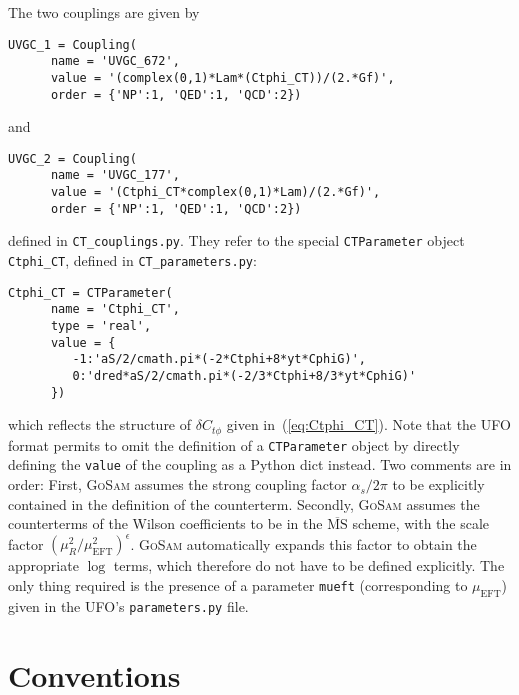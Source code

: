 \documentclass[11pt,a4paper]{refrep}
\newcommand{\gosam}{\textsc{GoSam}\xspace}
\newcommand{\python}{{Python}\xspace}
\begin{document}
The two couplings are given by
\begin{lstlisting}[gobble=3,style=py]
   UVGC_1 = Coupling(
      name = 'UVGC_672',
      value = '(complex(0,1)*Lam*(Ctphi_CT))/(2.*Gf)',
      order = {'NP':1, 'QED':1, 'QCD':2})
\end{lstlisting}
and
\begin{lstlisting}[gobble=3,style=py]
   UVGC_2 = Coupling(
      name = 'UVGC_177',
      value = '(Ctphi_CT*complex(0,1)*Lam)/(2.*Gf)',
      order = {'NP':1, 'QED':1, 'QCD':2})
\end{lstlisting}
defined in \texttt{CT\_couplings.py}. They refer to the special \texttt{CTParameter} object \texttt{Ctphi\_CT}, defined in \texttt{CT\_parameters.py}:
\begin{lstlisting}[gobble=3,style=py]
   Ctphi_CT = CTParameter(
      name = 'Ctphi_CT',
      type = 'real',
      value = {
         -1:'aS/2/cmath.pi*(-2*Ctphi+8*yt*CphiG)',
         0:'dred*aS/2/cmath.pi*(-2/3*Ctphi+8/3*yt*CphiG)'
      })
\end{lstlisting}
which reflects the structure of $\delta C_{t\phi}$ given in~(\ref{eq:Ctphi_CT}). Note that the UFO format permits to omit the definition of a \texttt{CTParameter} object by directly defining the \texttt{value} of the coupling as a \python dict instead.
Two comments are in order: First, \gosam assumes the strong coupling factor $\alpha_s/2\pi$ to be explicitly contained in the definition of the counterterm. Secondly, \gosam assumes the counterterms of the Wilson coefficients to be in the $\overline{\text{MS}}$ scheme, with the scale factor $\left(\mu_R^2/\mu_\mathrm{EFT}^2\right)^\epsilon$. \gosam automatically expands this factor to obtain the appropriate $\log$ terms, which therefore do not have to be defined explicitly. The only thing required is the presence of a parameter \texttt{mueft} (corresponding to $\mu_\mathrm{EFT}$) given in the UFO's \texttt{parameters.py} file.


\appendix

\chapter{Conventions}
\label{sec:conventions}
\end{document}

